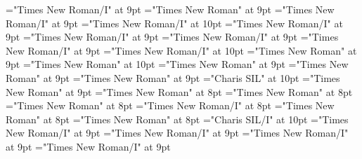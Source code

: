 \documentclass[gps1,twoside]{article}
\begin{document}
\font\morphosyntaxanalysissensesensesentrysensespanspandiventryletData="Times New Roman/I" at 9pt
\font\morphosyntaxanalysissensesensesentryaftersensespanspandiventryletData="Times New Roman" at 9pt
\font\partofspeechmorphosyntaxanalysissensesensesentrysensespanspandiventryletData="Times New Roman/I" at 9pt
\font\spanenpartofspeechmorphosyntaxanalysissensesensesentrysensespanspandiventryletData="Times New Roman/I" at 10pt
\font\spanmorphosyntaxanalysissensesensesentrysensespanspandiventryletData="Times New Roman/I" at 9pt
\font\slotsmorphosyntaxanalysissensesensesentrybeforemorphosyntaxanalysissensesensesentrysensespanspandiventryletData="Times New Roman/I" at 9pt
\font\slotspanmorphosyntaxanalysissensesensesentrysensespanspandiventryletData="Times New Roman/I" at 9pt
\font\spanslotspanmorphosyntaxanalysissensesensesentrysensespanspandiventryletData="Times New Roman/I" at 9pt
\font\spanenspanslotspanmorphosyntaxanalysissensesensesentrysensespanspandiventryletData="Times New Roman/I" at 10pt
\font\spansensespanspandiventryletData="Times New Roman" at 9pt
\font\spanenspansensespanspandiventryletData="Times New Roman" at 10pt
\font\pronunciationsentryafterdiventryletData="Times New Roman" at 9pt
\font\pronunciationspandiventryletData="Times New Roman" at 9pt
\font\spanpronunciationspandiventryletData="Times New Roman" at 9pt
\font\spanbzhfonipaspanpronunciationspandiventryletData="Charis SIL" at 10pt
\font\examplessensesensesentryaftersensespanspandiventryletData="Times New Roman" at 9pt
\font\examplespansensespanspandiventryletData="Times New Roman" at 8pt
\font\examplebeforespansensespanspandiventryletData="Times New Roman" at 8pt
\font\exampleafterspansensespanspandiventryletData="Times New Roman" at 8pt
\font\exampleexamplespansensespanspandiventryletData="Times New Roman/I" at 8pt
\font\examplebeforeexamplespansensespanspandiventryletData="Times New Roman" at 8pt
\font\exampleafterexamplespansensespanspandiventryletData="Times New Roman" at 8pt
\font\spanbzhexampleexamplespansensespanspandiventryletData="Charis SIL/I" at 10pt
\font\spanexampleexampleexamplessensesensessensesensesentryexamplespansensespanspandiventryletData="Times New Roman/I" at 9pt
\font\translationspanexampleexampleexamplessensesensessensesensesentryexamplespansensespanspandiventryletData="Times New Roman/I" at 9pt
\font\translationafterspanexampleexampleexamplessensesensessensesensesentryexamplespansensespanspandiventryletData="Times New Roman/I" at 9pt
\font\translationtranslationspanexampleexampleexamplessensesensessensesensesentryexamplespansensespanspandiventryletData="Times New Roman/I" at 9pt
\end{document}
